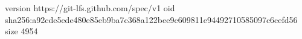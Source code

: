 version https://git-lfs.github.com/spec/v1
oid sha256:a92cde5ede480e85eb9ba7c368a122bee9c609811e94492710585097c6cefd56
size 4954
